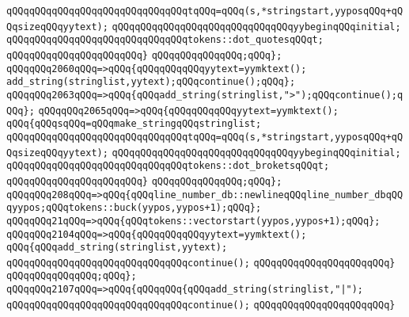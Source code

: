 \verb|qQQqqQQqqQQqqQQqqQQqqQQqqQQqqQQqtqQQq=qQQq(s,*stringstart,yyposqQQq+qQQqsizeqQQqyytext);|\newline
\verb|qQQqqQQqqQQqqQQqqQQqqQQqqQQqqQQqyybeginqQQqinitial;|\newline
\verb|qQQqqQQqqQQqqQQqqQQqqQQqqQQqqQQqtokens::dot_quotesqQQqt;|\newline
\verb|qQQqqQQqqQQqqQQqqQQqqQQq}|\newline
\verb|qQQqqQQqqQQqqQQq;qQQq};|\newline
\verb|qQQqqQQq2060qQQq=>qQQq{qQQqqQQqqQQqyytext=yymktext();|\newline
\verb|add_string(stringlist,yytext);qQQqcontinue();qQQq};|\newline
\verb|qQQqqQQq2063qQQq=>qQQq{qQQqadd_string(stringlist,">");qQQqcontinue();qQQq};|\newline
\verb|qQQqqQQq2065qQQq=>qQQq{qQQqqQQqqQQqyytext=yymktext();|\newline
\verb|qQQq{qQQqsqQQq=qQQqmake_stringqQQqstringlist;|\newline
\verb|qQQqqQQqqQQqqQQqqQQqqQQqqQQqqQQqtqQQq=qQQq(s,*stringstart,yyposqQQq+qQQqsizeqQQqyytext);|\newline
\verb|qQQqqQQqqQQqqQQqqQQqqQQqqQQqqQQqyybeginqQQqinitial;|\newline
\verb|qQQqqQQqqQQqqQQqqQQqqQQqqQQqqQQqtokens::dot_broketsqQQqt;|\newline
\verb|qQQqqQQqqQQqqQQqqQQqqQQq}|\newline
\verb|qQQqqQQqqQQqqQQq;qQQq};|\newline
\verb|qQQqqQQq208qQQq=>qQQq{qQQqline_number_db::newlineqQQqline_number_dbqQQqyypos;qQQqtokens::buck(yypos,yypos+1);qQQq};|\newline
\verb|qQQqqQQq21qQQq=>qQQq{qQQqtokens::vectorstart(yypos,yypos+1);qQQq};|\newline
\verb|qQQqqQQq2104qQQq=>qQQq{qQQqqQQqqQQqyytext=yymktext();|\newline
\verb|qQQq{qQQqadd_string(stringlist,yytext);|\newline
\verb|qQQqqQQqqQQqqQQqqQQqqQQqqQQqqQQqcontinue();|\newline
\verb|qQQqqQQqqQQqqQQqqQQqqQQq}|\newline
\verb|qQQqqQQqqQQqqQQq;qQQq};|\newline
\verb|qQQqqQQq2107qQQq=>qQQq{qQQqqQQq{qQQqadd_string(stringlist,"|\verb#|");#\newline
\verb|qQQqqQQqqQQqqQQqqQQqqQQqqQQqqQQqcontinue();|\newline
\verb|qQQqqQQqqQQqqQQqqQQqqQQq}|\newline
